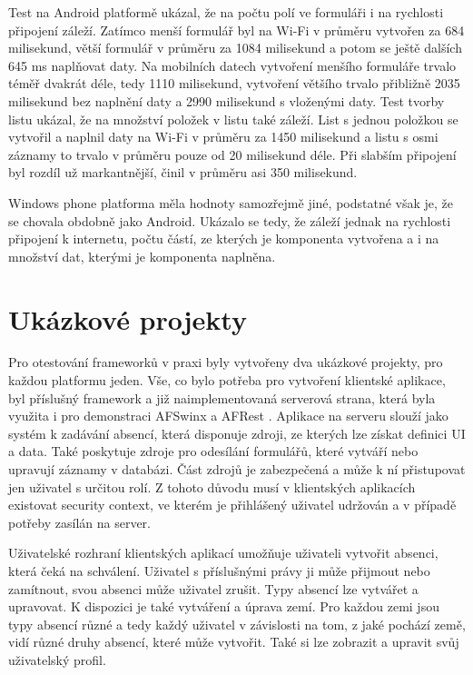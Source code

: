 Test na Android platformě ukázal, že na počtu polí ve formuláři i na rychlosti připojení záleží. Zatímco menší formulář byl na Wi-Fi v průměru vytvořen za 684 milisekund, větší formulář v průměru za 1084 milisekund a potom se ještě dalších 645 ms naplňovat daty. Na mobilních datech vytvoření menšího formuláře trvalo téměř dvakrát déle, tedy 1110 milisekund, vytvoření většího trvalo přibližně 2035 milisekund bez naplnění daty a 2990 milisekund s vloženými daty. Test tvorby listu ukázal, že na množství položek v listu také záleží. List s jednou položkou se vytvořil a naplnil daty na Wi-Fi v průměru za 1450 milisekund a listu s osmi záznamy to trvalo v průměru pouze od 20 milisekund déle. Při slabším připojení byl rozdíl už markantnější, činil v průměru asi 350 milisekund.

Windows phone platforma měla hodnoty samozřejmě jiné, podstatné však je, že se chovala obdobně jako Android. Ukázalo se tedy, že záleží jednak na rychlosti připojení k internetu, počtu částí, ze kterých je komponenta vytvořena a i na množství dat, kterými je komponenta naplněna.

\section{Ukázkové projekty}
Pro otestování frameworků v praxi byly vytvořeny dva ukázkové projekty, pro každou platformu jeden. Vše, co bylo potřeba pro vytvoření klientské aplikace, byl příslušný framework a již naimplementovaná serverová strana, která byla využita i pro demonstraci AFSwinx a AFRest \cite{tomasek-thesis}. Aplikace na serveru slouží jako systém k zadávání absencí, která disponuje zdroji, ze kterých lze získat definici UI a data. Také poskytuje zdroje pro odesílání formulářů, které vytváří nebo upravují záznamy v databázi. Část zdrojů je zabezpečená a může k ní přistupovat jen uživatel s určitou rolí. Z tohoto důvodu musí v klientských aplikacích existovat security context, ve kterém je přihlášený uživatel udržován a v případě potřeby zasílán na server. 

Uživatelské rozhraní klientských aplikací umožňuje uživateli vytvořit absenci, která čeká na schválení. Uživatel s příslušnými právy ji může přijmout nebo zamítnout, svou absenci může uživatel zrušit. Typy absencí lze vytvářet a upravovat. K dispozici je také vytváření a úprava zemí. Pro každou zemi jsou typy absencí různé a tedy každý uživatel v závislosti na tom, z jaké pochází země, vidí různé druhy absencí, které může vytvořit. Také si lze zobrazit a upravit svůj uživatelský profil.


